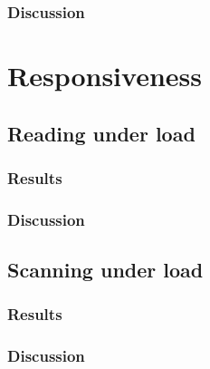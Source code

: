 \subsubsection{Discussion}

\section{Responsiveness}
\label{ch:evaluation:se:responsiveness}

\subsection{Reading under load}

\subsubsection{Results}

\subsubsection{Discussion}

\subsection{Scanning under load}

\subsubsection{Results}

\subsubsection{Discussion}
